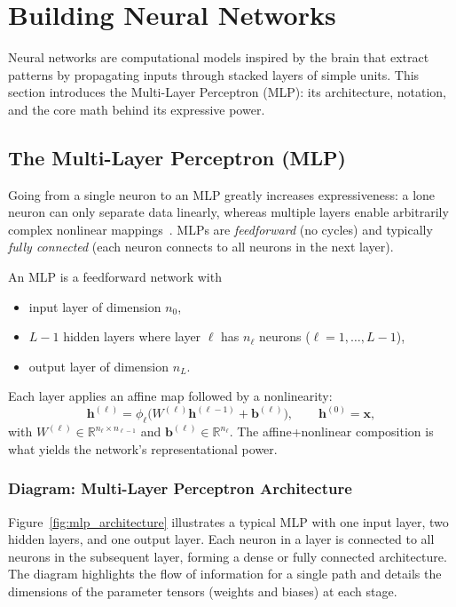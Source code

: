 
\section{Building Neural Networks}

Neural networks are computational models inspired by the brain that extract patterns by propagating inputs through stacked layers of simple units. This section introduces the Multi-Layer Perceptron (MLP): its architecture, notation, and the core math behind its expressive power.

\subsection{The Multi-Layer Perceptron (MLP)}

Going from a single neuron to an MLP greatly increases expressiveness: a lone neuron can only separate data linearly, whereas multiple layers enable arbitrarily complex nonlinear mappings~\cite{Rumelhart1986}. MLPs are \emph{feedforward} (no cycles) and typically \emph{fully connected} (each neuron connects to all neurons in the next layer).

\begin{definition}
An MLP is a feedforward network with
\begin{itemize}[leftmargin=2em]
  \item input layer of dimension $n_0$,
  \item $L-1$ hidden layers where layer $\ell$ has $n_\ell$ neurons ($\ell=1,\dots,L-1$),
  \item output layer of dimension $n_L$.
\end{itemize}
Each layer applies an affine map followed by a nonlinearity:
\[
  \mathbf{h}^{(\ell)} = \phi_\ell\!\big(W^{(\ell)}\mathbf{h}^{(\ell-1)} + \mathbf{b}^{(\ell)}\big),
\qquad \mathbf{h}^{(0)}=\mathbf{x},
\]
with $W^{(\ell)}\in\mathbb{R}^{n_\ell\times n_{\ell-1}}$ and $\mathbf{b}^{(\ell)}\in\mathbb{R}^{n_\ell}$. The affine+nonlinear composition is what yields the network's representational power.
\end{definition}

	\subsubsection{Diagram: Multi-Layer Perceptron Architecture}

	Figure~\ref{fig:mlp_architecture} illustrates a typical MLP with one input layer, two hidden layers, and one output layer. Each neuron in a layer is connected to all neurons in the subsequent layer, forming a dense or fully connected architecture. The diagram highlights the flow of information for a single path and details the dimensions of the parameter tensors (weights and biases) at each stage.

